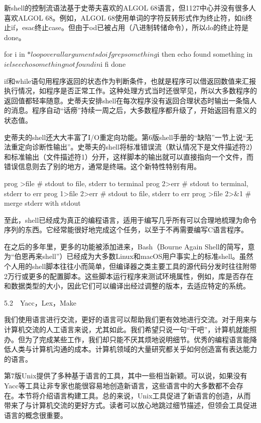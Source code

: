 \documentclass[a4paper,12pt,UTF8,twoside]{ctexbook}
\begin{document}
{新shell的控制流语法基于史蒂夫喜欢的ALGOL 68语言，但1127中心并没有很多人喜欢ALGOL 68。例如，ALGOL 68使用单词的字符反转形式作为终止符，如fi终止if，esac终止case。但由于od已被占用（八进制转储命令），所以do的终止符是done。

for i in $* loop over all arguments do if grep something $i then echo found something in $i else echo something not found in $i fi done

if和while语句用程序返回的状态作为判断条件，也就是程序可以借返回数值来汇报执行情况，如程序是否正常工作。这种处理方式当时还很罕见，所以大多数程序的返回值都轻率随意。史蒂夫安排shell在每次程序没有返回合理状态时输出一条恼人的消息。程序自动“话痨”持续一周之后，大多数程序都升级了，开始返回有意义的状态值。

史蒂夫的shell还大大丰富了I/O重定向功能。第6版shell手册的“缺陷”一节上说“无法重定向诊断性输出”。史蒂夫的shell将标准错误流（默认情况下是文件描述符2）和标准输出（文件描述符1）分开，这样脚本的输出就可以直接指向一个文件，而错误信息则去了别的地方，通常是终端。这个新特性特别有用。

prog >file # stdout to file, stderr to terminal prog 2>err # stdout to terminal, stderr to err prog 1>file 2>err # stdout to file, stderr to err prog >file 2>\&1 # merge stderr with stdout

至此，shell已经成为真正的编程语言，适用于编写几乎所有可以合理地梳理为命令序列的东西。它经常能很好地完成这个任务，以至于不再需要编写C语言程序。

在之后的多年里，更多的功能被添加进来，Bash（Bourne Again Shell的简写，意为“伯恩再来shell”）已经成为大多数Linux和macOS用户事实上的标准shell。虽然个人用的shell脚本往往小而简单，但编译器之类主要工具的源代码分发时往往附带2万行或更多的配置脚本。这些脚本运行程序来测试环境属性，例如，库是否存在和数据类型的大小，因此它们可以编译出经过调整的版本，去适应特定的系统。





5.2　Yacc，Lex，Make


我们使用语言进行交流，更好的语言可以帮助我们更有效地进行交流。对于用来与计算机交流的人工语言来说，尤其如此。我们希望只说一句“干吧”，计算机就能照办。但为了完成某些工作，我们却只能不厌其烦地说明细节。优秀的编程语言能降低人类与计算机沟通的成本。计算机领域的大量研究都关乎如何创造富有表达能力的语言。

第7版Unix提供了多种基于语言的工具，其中一些相当新颖。可以说，如果没有Yacc等工具让非专家也能很容易地创造新语言，这些语言中的大多数都不会存在。本节将介绍语言构建工具。总的来说，Unix工具促进了新语言的创造，从而带来了与计算机交流的更好方式。读者可以放心地跳过细节描述，但领会工具促进语言的概念很重要。

}
\end{document}
